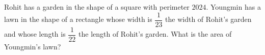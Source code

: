 Rohit has a garden in the shape of a square with perimeter $2024$. Youngmin has a lawn in the shape of a rectangle whose width is $\dfrac{1}{23}$ the width of Rohit's garden and whose length is $\dfrac{1}{22}$  the length of Rohit's garden. What is the area of Youngmin's lawn?
